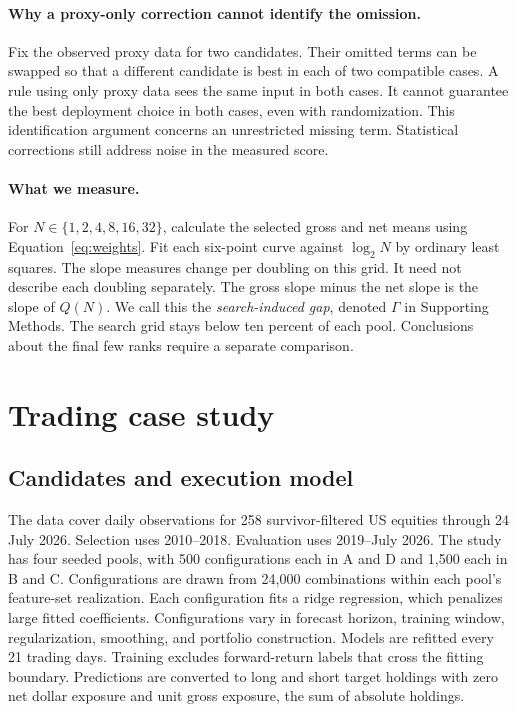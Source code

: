 \documentclass{article}
\begin{document}
\paragraph{Why a proxy-only correction cannot identify the omission.}
Fix the observed proxy data for two candidates. Their omitted terms can be swapped so that a different candidate is best in each of two compatible cases. A rule using only proxy data sees the same input in both cases. It cannot guarantee the best deployment choice in both cases, even with randomization. This identification argument concerns an unrestricted missing term. Statistical corrections still address noise in the measured score.

\paragraph{What we measure.}
For $N\in\{1,2,4,8,16,32\}$, calculate the selected gross and net means using Equation~\eqref{eq:weights}. Fit each six-point curve against $\log_2 N$ by ordinary least squares. The slope measures change per doubling on this grid. It need not describe each doubling separately. The gross slope minus the net slope is the slope of $Q(N)$. We call this the \emph{search-induced gap}, denoted $\Gamma$ in Supporting Methods. The search grid stays below ten percent of each pool. Conclusions about the final few ranks require a separate comparison.

\section{Trading case study}
\subsection{Candidates and execution model}
The data cover daily observations for 258 survivor-filtered US equities through 24 July 2026. Selection uses 2010--2018. Evaluation uses 2019--July 2026. The study has four seeded pools, with 500 configurations each in A and D and 1,500 each in B and C. Configurations are drawn from 24,000 combinations within each pool's feature-set realization. Each configuration fits a ridge regression, which penalizes large fitted coefficients. Configurations vary in forecast horizon, training window, regularization, smoothing, and portfolio construction. Models are refitted every 21 trading days. Training excludes forward-return labels that cross the fitting boundary. Predictions are converted to long and short target holdings with zero net dollar exposure and unit gross exposure, the sum of absolute holdings.
\end{document}

